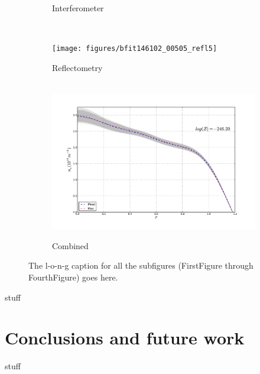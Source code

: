 \documentclass[12pt]{article}
\numberwithin{equation}{section}
\begin{document}
\begin{figure}[ht]
\begin{subfigure}[b]{0.5\textwidth}
		\vspace{-30pt}
		\caption{Interferometer}
		\label{fig:inter505}
	\end{subfigure} \\%
	\begin{subfigure}[b]{0.5\textwidth}
		\centering
		\texttt{[image: figures/bfit146102\_00505\_refl5]}
		\vspace{-30pt}
		\caption{Reflectometry}
		\label{fig:refl505}
	\end{subfigure}
	\hspace{-20pt}
	\begin{subfigure}[b]{0.5\textwidth}
		\centering‪
		\includegraphics[width=\textwidth,keepaspectratio=true]{figures/bfit146102_00505_all5}
		\vspace{-30pt}
		\caption{Combined}
		\label{fig:all505}
	\end{subfigure}
	\caption{The l-o-n-g caption for all the subfigures (FirstFigure through FourthFigure) goes here.}
	\label{fig:dne505}
\end{figure}
stuff
\section{Conclusions and future work}
stuff
\newpage


\end{document}
